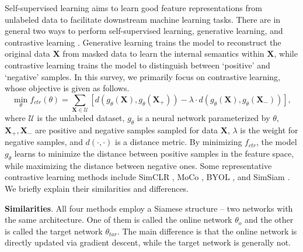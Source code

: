 \documentclass[11pt]{article}
\begin{document}
Self-supervised learning aims to learn good feature representations from unlabeled data to facilitate downstream machine learning tasks. There are in general two ways to perform self-supervised learning, generative learning, and contrastive learning \cite{Yilun-liu2021self}. Generative learning trains the model to reconstruct the original data $\mathbf{X}$ from masked data to learn the internal semantics within $\mathbf{X}$, while contrastive learning trains the model to distinguish between `positive' and `negative' samples. In this survey, we primarily focus on contrastive learning, whose objective is given as follows.
\begin{equation}
    \min_\theta f_{ctr}(\theta) = \sum_{\mathbf{X}\in\mathcal{U}}\left[d\left(g_\theta(\mathbf{X}), g_\theta(\mathbf{X}_+)\right) - \lambda\cdot d\left(g_\theta(\mathbf{X}), g_\theta(\mathbf{X}_{-})\right)\right],
    \label{eqn:self}
\end{equation}
where $\mathcal{U}$ is the unlabeled dataset, $g_\theta$ is a neural network parameterized by $\theta$, $\mathbf{X}_+, \mathbf{X}_-$ are positive and negative samples sampled for data $\mathbf{X}$, $\lambda$ is the weight for negative samples, and $d(\cdot, \cdot)$ is a distance metric. By minimizing $f_{ctr}$, the model $g_\theta$ learns to minimize the distance between positive samples in the feature space, while maximizing the distance between negative ones. Some representative contrastive learning methods include SimCLR \cite{Yilun-chen2020simple}, MoCo \cite{Yilun-he2020momentum}, BYOL \cite{Yilun-grill2020bootstrap}, and SimSiam \cite{Yilun-chen2021exploring}. We briefly explain their similarities and differences.

\textbf{Similarities}. All four methods employ a Siamese structure -- two networks with the same architecture. One of them is called the online network $\theta_{o}$ and the other is called the target network $\theta_{tar}$. The main difference is that the online network is directly updated via gradient descent, while the target network is generally not.
\end{document}
